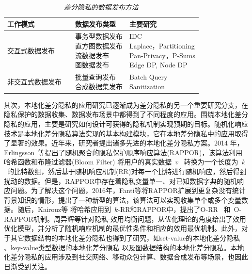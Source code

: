 \begin{table}[htbp]
\caption{{\em 差分隐私的数据发布方法}}
\label{tab:survey_dp_publishing}
\centering
\fontsize{10pt}{\baselineskip}\selectfont
\begin{tabular}{p{}p{}p{}p{}}
\toprule
	\textbf{工作模式}& &\textbf{数据发布类型}&\textbf{主要研究}\\
	\midrule
   交互式数据发布& &\makecell[l]{事务型数据发布 \\ 直方图数据发布 \\ 流数据发布\\ 图数据发布} &\makecell[l]{
IDC\cite{gupta2012iterative}\\Laplace\cite{dwork2006calibrating}，Partitioning\cite{chen2011publishing}\\ Pan-Privacy\cite{dwork2010differential}，P-Sums\cite{chan2011private}\\ Edge DP\cite{zhang2015private}, Node DP\cite{kasiviswanathan2013analyzing}} \\
   \midrule
非交互式数据发布& &\makecell[l]{批量查询发布\\ 合成数据集发布} & \makecell[l]{Batch Query\cite{yuan2012low}\\ Sanitization\cite{dwork2009on}}\\

  \bottomrule
\end{tabular}
\end{table}

其次，本地化差分隐私的应用研究\cite{yeqingqing2018}已逐渐成为差分隐私的另一个重要研究分支，在隐私保护的数据收集、数据发布场景中都得到了不同程度的应用。围绕本地化差分隐私的应用，主要是研究如何设计可获得的隐私机制实现预期的目标。随机化响应技术是本地化差分隐私算法实现的基本构建模块，它在本地差分隐私中的应用取得了显著的效果。近年来，研究者提出诸多先进的本地化差分隐私方案。2014 年，Erlingsson~等\cite{erlingsson2014rappor}提出了随机聚合的隐私保护顺序响应算法(RAPPOR)，该算法利用哈希函数和布隆过滤器(Bloom Filter) 将用户的真实数据~$v$~ 转换为一个长度为~$k$~的比特数组，然后基于随机响应机制(RR)对每一个比特进行随机响应，然后得到扰动的数据。但是，RAPPOR中存在着隐私变量单一、对已知数据字典的随机响应问题。为了解决这个问题，2016年，Fanti等\cite{fanti2016building}将RAPPOR扩展到更复杂没有统计背景知识的情形，提出了一种新型的算法，该算法可以实现收集单个或多个变量数据。随后，Kairouz等\cite{kairouz2016discrete} 将哈希应用到~$k$-RR和RAPPOR中，提出了O-RR~ 和~O-RAPPOR机制。周异辉等\cite{zhouyihui2019}针对隐私-效用均衡问题，从优化理论的角度给出了效用优化模型，并分析了随机响应机制的最优性条件和相应的效用最优机制。此外，对于其它数据结构的本地化差分隐私也得到了研究，如set-value的本地化差分隐私
\cite{wang2018privset,qin2016heavy}、key-value类型数据的本地化差分隐私\cite{ye2019privkv} 以及图数据结构的本地化差分隐私\cite{wei2020asgldp}。本地化差分隐私的应用涉及到社交网络\cite{qin2017generating}、移动众包计算\cite{sei2017differential}、数据合成发布\cite{ren2018textsf,yang2017copula}等场景，也因此日渐受到关注。

